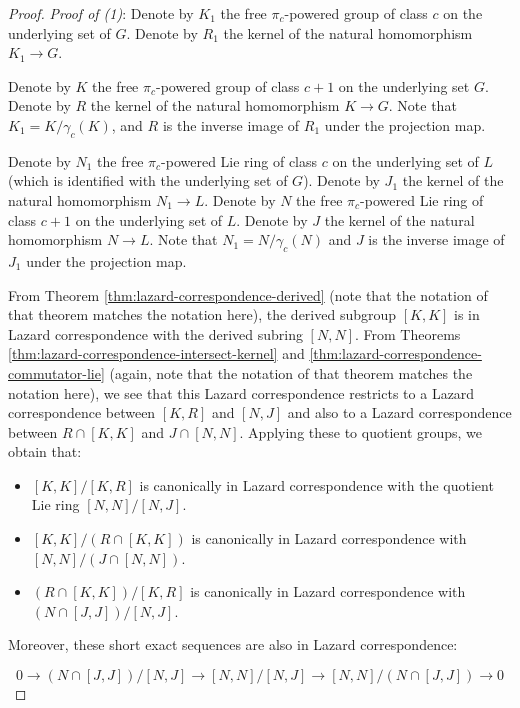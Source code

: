 \documentclass{ucetd}
\begin{document}
\begin{proof}
  {\em Proof of (1)}: Denote by $K_1$ the free $\pi_c$-powered group
  of class $c$ on the underlying set of $G$. Denote by $R_1$ the
  kernel of the natural homomorphism $K_1 \to G$.

  Denote by $K$ the free $\pi_c$-powered group of class $c + 1$ on the
  underlying set $G$. Denote by $R$ the kernel of the natural
  homomorphism $K \to G$. Note that $K_1 = K/\gamma_c(K)$, and $R$ is
  the inverse image of $R_1$ under the projection map.

  Denote by $N_1$ the free $\pi_c$-powered Lie ring of class $c$ on the
  underlying set of $L$ (which is identified with the underlying set
  of $G$). Denote by $J_1$ the kernel of the natural homomorphism $N_1
  \to L$. Denote by $N$ the free $\pi_c$-powered Lie ring of class $c +
  1$ on the underlying set of $L$. Denote by $J$ the kernel of the natural
  homomorphism $N \to L$. Note that $N_1 = N/\gamma_c(N)$ and $J$ is
  the inverse image of $J_1$ under the projection map.

  From Theorem \ref{thm:lazard-correspondence-derived} (note that the
  notation of that theorem matches the notation here), the derived
  subgroup $[K,K]$ is in Lazard correspondence with the derived
  subring $[N,N]$. From Theorems
  \ref{thm:lazard-correspondence-intersect-kernel} and
  \ref{thm:lazard-correspondence-commutator-lie} (again, note that the
  notation of that theorem matches the notation here), we see that
  this Lazard correspondence restricts to a Lazard correspondence
  between $[K,R]$ and $[N,J]$ and also to a Lazard correspondence
  between $R \cap [K,K]$ and $J \cap [N,N]$. Applying these to
  quotient groups, we obtain that:

  \begin{itemize}
  \item $[K,K]/[K,R]$ is canonically in Lazard correspondence with the
    quotient Lie ring $[N,N]/[N,J]$.
  \item $[K,K]/(R \cap [K,K])$ is canonically in Lazard correspondence
    with $[N,N]/(J \cap [N,N])$. 
  \item $(R \cap [K,K])/[K,R]$ is canonically in Lazard correspondence
    with $(N \cap [J,J])/[N,J]$.
  \end{itemize}

  Moreover, these short exact sequences are also in Lazard
  correspondence:

  $$0 \to (N \cap [J,J])/[N,J] \to [N,N]/[N,J] \to [N,N]/(N \cap [J,J]) \to 0$$


\end{proof}
\end{document}
